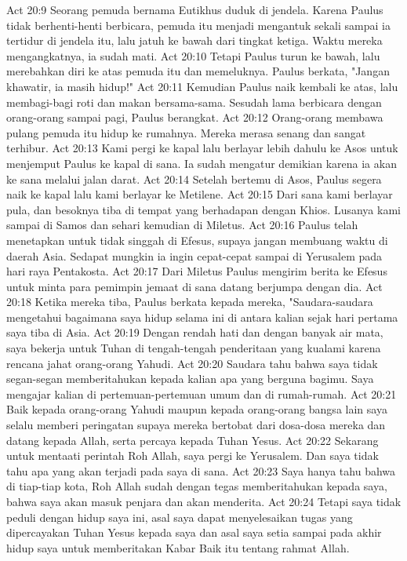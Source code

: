 Act 20:9  Seorang pemuda bernama Eutikhus duduk di jendela. Karena Paulus tidak berhenti-henti berbicara, pemuda itu menjadi mengantuk sekali sampai ia tertidur di jendela itu, lalu jatuh ke bawah dari tingkat ketiga. Waktu mereka mengangkatnya, ia sudah mati.
Act 20:10  Tetapi Paulus turun ke bawah, lalu merebahkan diri ke atas pemuda itu dan memeluknya. Paulus berkata, "Jangan khawatir, ia masih hidup!"
Act 20:11  Kemudian Paulus naik kembali ke atas, lalu membagi-bagi roti dan makan bersama-sama. Sesudah lama berbicara dengan orang-orang sampai pagi, Paulus berangkat.
Act 20:12  Orang-orang membawa pulang pemuda itu hidup ke rumahnya. Mereka merasa senang dan sangat terhibur.
Act 20:13  Kami pergi ke kapal lalu berlayar lebih dahulu ke Asos untuk menjemput Paulus ke kapal di sana. Ia sudah mengatur demikian karena ia akan ke sana melalui jalan darat.
Act 20:14  Setelah bertemu di Asos, Paulus segera naik ke kapal lalu kami berlayar ke Metilene.
Act 20:15  Dari sana kami berlayar pula, dan besoknya tiba di tempat yang berhadapan dengan Khios. Lusanya kami sampai di Samos dan sehari kemudian di Miletus.
Act 20:16  Paulus telah menetapkan untuk tidak singgah di Efesus, supaya jangan membuang waktu di daerah Asia. Sedapat mungkin ia ingin cepat-cepat sampai di Yerusalem pada hari raya Pentakosta.
Act 20:17  Dari Miletus Paulus mengirim berita ke Efesus untuk minta para pemimpin jemaat di sana datang berjumpa dengan dia.
Act 20:18  Ketika mereka tiba, Paulus berkata kepada mereka, "Saudara-saudara mengetahui bagaimana saya hidup selama ini di antara kalian sejak hari pertama saya tiba di Asia.
Act 20:19  Dengan rendah hati dan dengan banyak air mata, saya bekerja untuk Tuhan di tengah-tengah penderitaan yang kualami karena rencana jahat orang-orang Yahudi.
Act 20:20  Saudara tahu bahwa saya tidak segan-segan memberitahukan kepada kalian apa yang berguna bagimu. Saya mengajar kalian di pertemuan-pertemuan umum dan di rumah-rumah.
Act 20:21  Baik kepada orang-orang Yahudi maupun kepada orang-orang bangsa lain saya selalu memberi peringatan supaya mereka bertobat dari dosa-dosa mereka dan datang kepada Allah, serta percaya kepada Tuhan Yesus.
Act 20:22  Sekarang untuk mentaati perintah Roh Allah, saya pergi ke Yerusalem. Dan saya tidak tahu apa yang akan terjadi pada saya di sana.
Act 20:23  Saya hanya tahu bahwa di tiap-tiap kota, Roh Allah sudah dengan tegas memberitahukan kepada saya, bahwa saya akan masuk penjara dan akan menderita.
Act 20:24  Tetapi saya tidak peduli dengan hidup saya ini, asal saya dapat menyelesaikan tugas yang dipercayakan Tuhan Yesus kepada saya dan asal saya setia sampai pada akhir hidup saya untuk memberitakan Kabar Baik itu tentang rahmat Allah.
